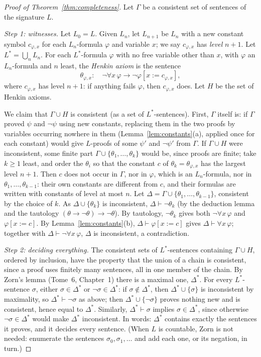 \begin{proof}[Proof of Theorem~\ref{thm:completeness}]
Let $\Gamma$ be a consistent set of sentences of the signature $L$.

\emph{Step 1: witnesses.} Let $L_0=L$. Given $L_n$, let $L_{n+1}$ be $L_n$ with a new constant symbol $c_{\varphi,x}$ for each $L_n$-formula $\varphi$ and variable $x$; we say $c_{\varphi,x}$ has \emph{level} $n+1$. Let $L^*=\bigcup_nL_n$. For each $L^*$-formula $\varphi$ with no free variable other than $x$, with $\varphi$ an $L_n$-formula and $n$ least, the \emph{Henkin axiom} is the sentence
\[
\theta_{\varphi,x}:\quad\neg\forall x\,\varphi\to\neg\varphi[x:=c_{\varphi,x}],
\]
where $c_{\varphi,x}$ has level $n+1$: if anything fails $\varphi$, then $c_{\varphi,x}$ does. Let $H$ be the set of Henkin axioms.

We claim that $\Gamma\cup H$ is consistent (as a set of $L^*$-sentences). First, $\Gamma$ itself is: if $\Gamma$ proved $\psi$ and $\neg\psi$ using new constants, replacing them in the two proofs by variables occurring nowhere in them (Lemma~\ref{lem:constants}(a), applied once for each constant) would give $L$-proofs of some $\psi'$ and $\neg\psi'$ from $\Gamma$. If $\Gamma\cup H$ were inconsistent, some finite part $\Gamma\cup\{\theta_1,\dots,\theta_k\}$ would be, since proofs are finite; take $k\ge1$ least, and order the $\theta_i$ so that the constant $c$ of $\theta_k=\theta_{\varphi,x}$ has the largest level $n+1$. Then $c$ does not occur in $\Gamma$, nor in $\varphi$, which is an $L_n$-formula, nor in $\theta_1,\dots,\theta_{k-1}$: their own constants are different from $c$, and their formulas are written with constants of level at most $n$. Let $\Delta=\Gamma\cup\{\theta_1,\dots,\theta_{k-1}\}$, consistent by the choice of $k$. As $\Delta\cup\{\theta_k\}$ is inconsistent, $\Delta\vdash\neg\theta_k$ (by the deduction lemma and the tautology $(\theta\to\neg\theta)\to\neg\theta$). By tautology, $\neg\theta_k$ gives both $\neg\forall x\,\varphi$ and $\varphi[x:=c]$. By Lemma~\ref{lem:constants}(b), $\Delta\vdash\varphi[x:=c]$ gives $\Delta\vdash\forall x\,\varphi$; together with $\Delta\vdash\neg\forall x\,\varphi$, $\Delta$ is inconsistent, a contradiction.

\emph{Step 2: deciding everything.} The consistent sets of $L^*$-sentences containing $\Gamma\cup H$, ordered by inclusion, have the property that the union of a chain is consistent, since a proof uses finitely many sentences, all in one member of the chain. By Zorn's lemma (Tome~6, Chapter~1) there is a maximal one, $\Delta^*$. For every $L^*$-sentence $\sigma$, either $\sigma\in\Delta^*$ or $\neg\sigma\in\Delta^*$: if $\sigma\notin\Delta^*$, then $\Delta^*\cup\{\sigma\}$ is inconsistent by maximality, so $\Delta^*\vdash\neg\sigma$ as above; then $\Delta^*\cup\{\neg\sigma\}$ proves nothing new and is consistent, hence equal to $\Delta^*$. Similarly, $\Delta^*\vdash\sigma$ implies $\sigma\in\Delta^*$, since otherwise $\neg\sigma\in\Delta^*$ would make $\Delta^*$ inconsistent. In words: $\Delta^*$ contains exactly the sentences it proves, and it decides every sentence. (When $L$ is countable, Zorn is not needed: enumerate the sentences $\sigma_0,\sigma_1,\dots$ and add each one, or its negation, in turn.)


\end{proof}
